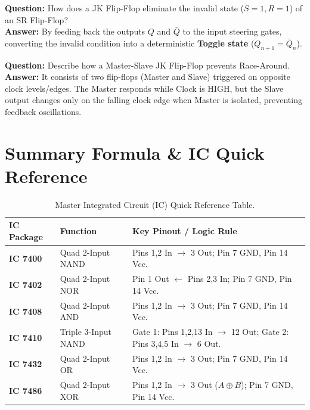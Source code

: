 \begin{vivaqa}[SR to JK Transformation]
\textbf{Question:} How does a JK Flip-Flop eliminate the invalid state ($S=1, R=1$) of an SR Flip-Flop?\\[4pt]
\textbf{Answer:} By feeding back the outputs $Q$ and $\bar{Q}$ to the input steering gates, converting the invalid condition into a deterministic \textbf{Toggle state} ($Q_{n+1} = \bar{Q}_n$).
\end{vivaqa}

\begin{vivaqa}
\textbf{Question:} Describe how a Master-Slave JK Flip-Flop prevents Race-Around.\\[4pt]
\textbf{Answer:} It consists of two flip-flops (Master and Slave) triggered on opposite clock levels/edges. The Master responds while Clock is HIGH, but the Slave output changes only on the falling clock edge when Master is isolated, preventing feedback oscillations.
\end{vivaqa}

\section{Summary Formula \& IC Quick Reference}

\begin{table}[htbp]
\centering
\small
\begin{tabularx}{\textwidth}{l p{4.5cm} X}
\toprule
\textbf{IC Package} & \textbf{Function} & \textbf{Key Pinout / Logic Rule} \\
\midrule
\textbf{IC 7400} & Quad 2-Input NAND & Pins 1,2 In $\to$ 3 Out; Pin 7 GND, Pin 14 Vcc. \\
\textbf{IC 7402} & Quad 2-Input NOR & Pin 1 Out $\leftarrow$ Pins 2,3 In; Pin 7 GND, Pin 14 Vcc. \\
\textbf{IC 7408} & Quad 2-Input AND & Pins 1,2 In $\to$ 3 Out; Pin 7 GND, Pin 14 Vcc. \\
\textbf{IC 7410} & Triple 3-Input NAND & Gate 1: Pins 1,2,13 In $\to$ 12 Out; Gate 2: Pins 3,4,5 In $\to$ 6 Out. \\
\textbf{IC 7432} & Quad 2-Input OR & Pins 1,2 In $\to$ 3 Out; Pin 7 GND, Pin 14 Vcc. \\
\textbf{IC 7486} & Quad 2-Input XOR & Pins 1,2 In $\to$ 3 Out ($A \oplus B$); Pin 7 GND, Pin 14 Vcc. \\
\bottomrule
\end{tabularx}
\caption{Master Integrated Circuit (IC) Quick Reference Table.}
\label{tab:master-ic-ref}
\end{table}

